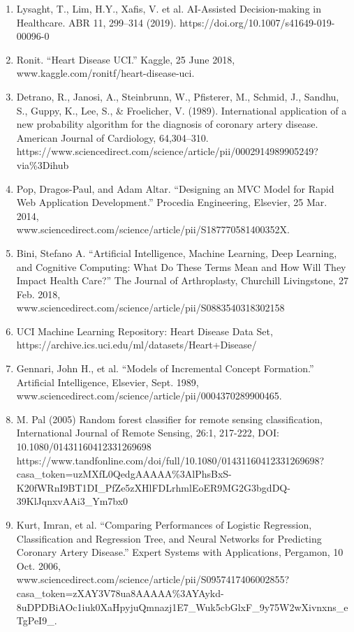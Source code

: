 \documentclass[12pt]{article}
\begin{document}
\begin{enumerate}
    \item Lysaght, T., Lim, H.Y., Xafis, V. et al. AI-Assisted Decision-making in Healthcare. ABR 11, 299–314 (2019). https://doi.org/10.1007/s41649-019-00096-0
    \item Ronit. “Heart Disease UCI.” Kaggle, 25 June 2018, \\ www.kaggle.com/ronitf/heart-disease-uci.
    \item Detrano, R., Janosi, A., Steinbrunn, W., Pfisterer, M., 
    Schmid, J., Sandhu, S., Guppy, K., Lee, S., \& Froelicher, V. 
    (1989). International application of a new probability algorithm 
    for the diagnosis of coronary artery disease. American Journal of 
    Cardiology, 64,304--310. \\ https://www.sciencedirect.com/science/article/pii/0002914989905249?via\%3Dihub
    \item Pop, Dragos-Paul, and Adam Altar. “Designing an MVC Model for Rapid Web Application Development.” Procedia Engineering, Elsevier, 25 Mar. 2014, \\ www.sciencedirect.com/science/article/pii/S187770581400352X.
    \item Bini, Stefano A. “Artificial Intelligence, Machine Learning, Deep Learning, and Cognitive Computing: What Do These Terms Mean and How Will They Impact Health Care?” The Journal of Arthroplasty, Churchill Livingstone, 27 Feb. 2018, \\ www.sciencedirect.com/science/article/pii/S0883540318302158
    \item UCI Machine Learning Repository: Heart Disease Data Set, \\ https://archive.ics.uci.edu/ml/datasets/Heart+Disease/
    \item Gennari, John H., et al. “Models of Incremental Concept Formation.” Artificial Intelligence, Elsevier, Sept. 1989, \\ www.sciencedirect.com/science/article/pii/0004370289900465.
    \item M. Pal (2005) Random forest classifier for remote sensing classification, International Journal of Remote Sensing, 26:1, 217-222, DOI: 10.1080/01431160412331269698 \\
    https://www.tandfonline.com/doi/full/10.1080/01431160412331269698?casa\_token=uzMXfL0QedgAAAAA\%3AlPhsBxS-K20fWRnI9BT1DI\_PfZe5zXHlFDLrhmlEoER9MG2G3bgdDQ-39KlJqnxvAAi3\_Ym7bx0
    \item Kurt, Imran, et al. “Comparing Performances of Logistic Regression, Classification and Regression Tree, and Neural Networks for Predicting Coronary Artery Disease.” Expert Systems with Applications, Pergamon, 10 Oct. 2006, \\ www.sciencedirect.com/science/article/pii/S0957417406002855?casa\_token=zXAY3V78ua8AAAAA\%3AYAykd-8uDPDBiAOc1iuk0XaHpyjuQmnazj1E7\_Wuk5cbGlxF\_9y75W2wXivnxns\_eTgPeI9\_.

\end{enumerate}
\end{document}
